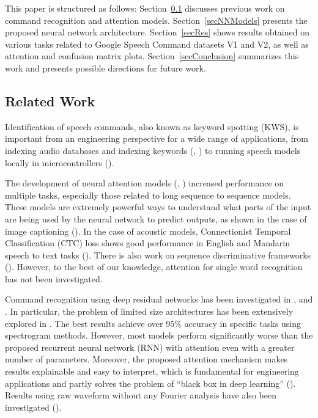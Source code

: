 \documentclass[authoryear, review, 12pt, 3p]{elsarticle}
\begin{document}
This paper is structured as follows: Section~\ref{secRelWork} discusses previous work on command recognition and attention models. Section~\ref{secNNModels} presents the proposed neural network architecture. Section~\ref{secRes} shows results obtained on various tasks related to Google Speech Command datasets V1 and V2, as well as attention and confusion matrix plots. Section~\ref{secConclusion} summarizes this work and presents possible directions for future work.




\subsection{Related Work}
\label{secRelWork}

Identification of speech commands, also known as keyword spotting (KWS), is important from an engineering perspective for a wide range of applications, from indexing audio databases and indexing keywords (\cite{TABIBIAN20131660}, \cite{SANGEETHA2014287}) to running speech models locally in microcontrollers (\cite{DBLP:journals/corr/abs-1711-07128}).

The development of neural attention models (\cite{DBLP:journals/corr/BahdanauCB14}, \cite{DBLP:journals/corr/VaswaniSPUJGKP17}) increased performance on multiple tasks, especially those related to long sequence to sequence models. These models are extremely powerful ways to understand what parts of the input are being used by the neural network to predict outputs, as shown in the case of image captioning (\cite{DBLP:journals/corr/XuBKCCSZB15}). In the case of acoustic models, Connectionist Temporal Classification (CTC) loss shows good performance in English and Mandarin speech to text tasks (\cite{DBLP:journals/corr/AmodeiABCCCCCCD15}). There is also work on sequence discriminative frameworks (\cite{CHEN2018100}). However, to the best of our knowledge, attention for single word recognition has not been investigated.

Command recognition using deep residual networks has been investigated in \cite{DBLP:journals/corr/abs-1710-10361}, \cite{DBLP:journals/corr/ArikKCHGFPC17} and \cite{Sainath2015ConvolutionalNN}. In particular, the problem of limited size architectures has been extensively explored in \cite{DBLP:journals/corr/abs-1711-07128}. The best results achieve over 95\% accuracy in specific tasks using spectrogram methods. However, most models perform significantly worse than the proposed recurrent neural network (RNN) with attention even with a greater number of parameters. Moreover, the proposed attention mechanism makes results explainable and easy to interpret, which is fundamental for engineering applications and partly solves the problem of ``black box in deep learning'' (\cite{DBLP:journals/corr/abs-1805-08355}). Results using raw waveform without any Fourier analysis have also been investigated (\cite{Jansson2018}).
\end{document}
